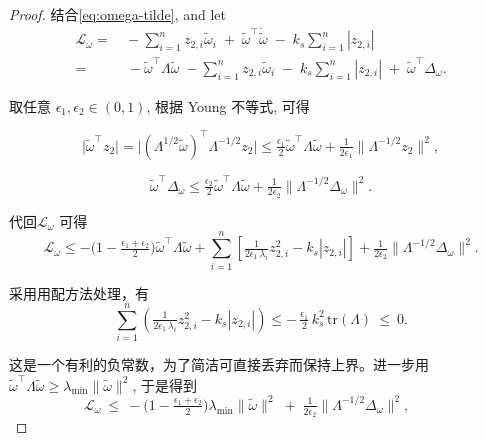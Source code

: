 \documentclass[pdflatex,sn-mathphys-num]{sn-jnl}%
\theoremstyle{thmstyleone}%
\theoremstyle{thmstyletwo}%
\theoremstyle{thmstylethree}%
\begin{document}
\begin{proof}


结合\cref{eq:omega-tilde}, and let
\begin{equation}\label{eq:50}
	\begin{aligned}
\mathcal{L}_\omega
=&\,-\sum_{i=1}^n z_{2,i}\tilde{\omega}_i\;+\;\tilde \omega^\top \dot{\tilde \omega}\;-\;k_s\sum_{i=1}^n | z_{2,i} |  \\
=&\;-\tilde\omega^\top\Lambda\tilde\omega\;-\sum_{i=1}^n z_{2,i}\tilde\omega_i\;-\;k_s\sum_{i=1}^n  | z_{2,i} |\;+\;\tilde\omega^\top\Delta_\omega .
\end{aligned}
\end{equation}

取任意 $\epsilon_1,\epsilon_2\in(0,1)$, 根据 Young 不等式, 可得

$$
\big|\tilde\omega^\top z_2 \big|
=\big|(\Lambda^{1/2}\tilde\omega)^\top\Lambda^{-1/2} z_2\big|
\le \tfrac{\epsilon_1}{2}\tilde\omega^\top\Lambda\tilde\omega
+ \tfrac{1}{2\epsilon_1}\big\|\Lambda^{-1/2} z_2\big\|^2,
$$

$$
\tilde\omega^\top\Delta_\omega
\le \tfrac{\epsilon_2}{2}\tilde\omega^\top\Lambda\tilde\omega
+\tfrac{1}{2\epsilon_2}\big\|\Lambda^{-1/2}\Delta_\omega\big\|^2 .
$$

代回$\mathcal{L}_\omega$ 可得
$$
\mathcal{L}_\omega
\le
-\Big(1-\tfrac{\epsilon_1+\epsilon_2}{2}\Big)\tilde\omega^\top\Lambda\tilde\omega
+\sum_{i=1}^n\!\left[\tfrac{1}{2\epsilon_1\,\lambda_{i}}z_{2,i}^2
- k_s |z_{2,i}|\right]
+\tfrac{1}{2\epsilon_2}\big\|\Lambda^{-1/2}\Delta_\omega\big\|^2 .
$$

采用用配方法处理，有
$$
\sum_{i=1}^n\!\left(\tfrac{1}{2\epsilon_1\,\lambda_{i}}z_{2,i}^2
- k_s |z_{2,i}|\right)
\le -\,\tfrac{\epsilon_1}{2}\,k_s^2\,\mathrm{tr}(\Lambda)\ \le\ 0.
$$

这是一个有利的负常数，为了简洁可直接丢弃而保持上界。进一步用 $\tilde\omega^\top\Lambda\tilde\omega\ge \lambda_{\min}\|\tilde\omega\|^2$, 于是得到
$$
\mathcal{L}_\omega
\ \le\
-\Big(1-\tfrac{\epsilon_1+\epsilon_2}{2}\Big)\lambda_{\min}\|\tilde\omega\|^2
\;+\;\tfrac{1}{2\epsilon_2}\big\|\Lambda^{-1/2}\Delta_\omega\big\|^2,\qquad
$$




\end{proof}
\end{document}
